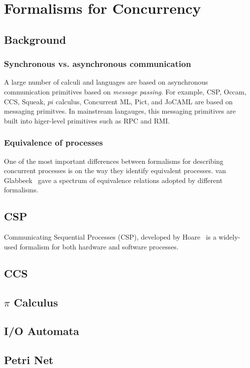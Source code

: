 \chapter{Formalisms for Concurrency}

\section{Background}



\subsection{Synchronous vs. asynchronous communication}

A large number of calculi and languages are based on asynchronous
communication primitives based on {\em message passing\/}.
For example, CSP, Occam, CCS, Squeak, $pi$ calculus, Concurrent ML,
Pict, and JoCAML are based on messaging primitves.
In mainstream langauges, this messaging primitives are built into
higer-level primitives such as RPC and RMI.


\subsection{Equivalence of processes}
One of the most important differences between formalisms for describing
concurrent processes is on the way they identify equivalent processes.
van Glabbeek~\cite{Glabbeek90} gave a spectrum of equivalence relations
adopted by different formalisms.


\section{CSP}
Communicating Sequential Processes (CSP), developed by Hoare~\cite{Hoare85} is a widely-used formalism for both
hardware and software processes.

\section{CCS}

\section{$\pi$ Calculus}

\section{I/O Automata}

\section{Petri Net}
